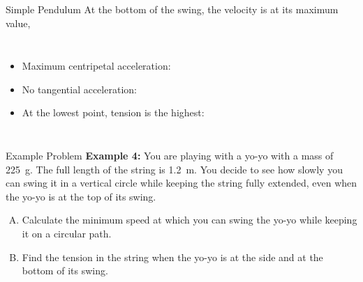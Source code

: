 \documentclass[12pt,compress,aspectratio=169]{beamer}
\newcommand{\eq}[2]{\vspace{#1}{\Large\begin{displaymath}#2\end{displaymath}}}
\begin{document}
\begin{frame}{Simple Pendulum}
  At the bottom of the swing, the velocity is at its maximum value,
  
  \vspace{.1in}\begin{columns}

    \begin{itemize}
    \item Maximum centripetal acceleration:

      \eq{-.25in}{
        a_c=\frac{v^2}r
      }
    \item No tangential acceleration:

      \eq{-.25in}{
        a_t=0
      }
    \item At the lowest point, tension is the highest:

      \eq{-.3in}{
        T=w+F_c=m\left(g+\frac{v^2}{r}\right)
      }
    \end{itemize}
  \end{columns}
\end{frame}



\begin{frame}{Example Problem}
  \textbf{Example 4:} You are playing with a yo-yo with a mass of
  \SI{225}{\gram}. The full length of the string is \SI{1.2}{\metre}. You
  decide to see how slowly you can swing it in a vertical circle while keeping
  the string fully extended, even when the yo-yo is at the top of its swing.
  \begin{enumerate}[A.]
  \item Calculate the minimum speed at which you can swing the yo-yo while
    keeping it on a circular path.
  \item Find the tension in the string when the yo-yo is at the side and at the
    bottom of its swing. 
  \end{enumerate}
\end{frame}
\end{document}
